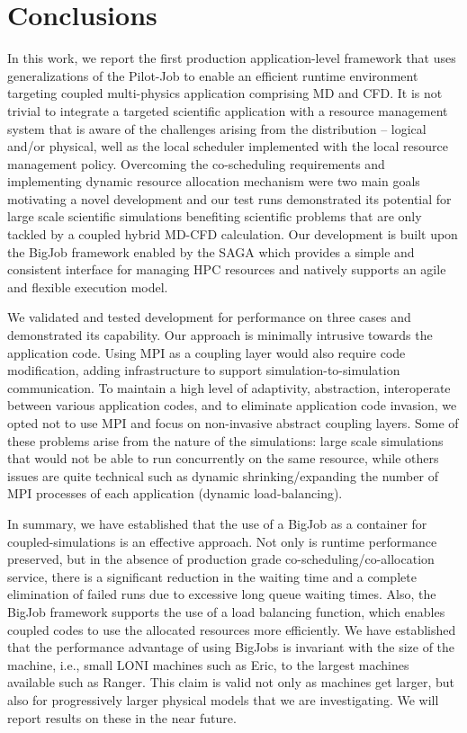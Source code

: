 \documentclass[conference,final]{IEEEtran}
\begin{document}
\section{Conclusions}


In this work, we report the first production application-level
framework that uses generalizations of the Pilot-Job to enable an
efficient runtime environment targeting coupled multi-physics
application comprising MD and CFD.  It is not trivial to integrate a
targeted scientific application with a resource management system that
is aware of the challenges arising from the distribution -- logical
and/or physical, well as the local scheduler implemented with the
local resource management policy.  Overcoming the co-scheduling
requirements and implementing dynamic resource allocation mechanism
were two main goals motivating a novel development and our test runs
demonstrated its potential for large scale scientific simulations
benefiting scientific problems that are only tackled by a coupled
hybrid MD-CFD calculation.  Our development is built upon the BigJob
framework enabled by the SAGA which provides a simple and consistent
interface for managing HPC resources and natively supports an agile
and flexible execution model.

We validated and tested development for performance on three cases and
demonstrated its capability.  Our approach is minimally intrusive
towards the application code.  Using MPI as a coupling layer would
also require code modification, adding infrastructure to support
simulation-to-simulation communication. To maintain a high level of
adaptivity, abstraction, interoperate between various application
codes, and to eliminate application code invasion, we opted not to use
MPI and focus on non-invasive abstract coupling layers.  Some of these
problems arise from the nature of the simulations: large scale
simulations that would not be able to run concurrently on the same
resource, while others issues are quite technical such as dynamic
shrinking/expanding the number of MPI processes of each application
(dynamic load-balancing).
 
In summary, we have established that the use of a BigJob as a
container for coupled-simulations is an effective approach. Not only
is runtime performance preserved, but in the absence of production
grade co-scheduling/co-allocation service, there is a significant
reduction in the waiting time and a complete elimination of failed
runs due to excessive long queue waiting times.  Also, the BigJob
framework supports the use of a load balancing function, which enables
coupled codes to use the allocated resources more efficiently. We have
established that the performance advantage of using BigJobs is
invariant with the size of the machine, i.e., small LONI machines such
as Eric, to the largest machines available such as Ranger. This claim
is valid not only as machines get larger, but also for progressively
larger physical models that we are investigating. We will report
results on these in the near future.
\end{document}
